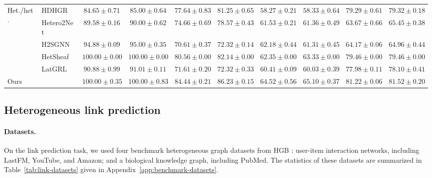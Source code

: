 \begin{table}[t]
{\begin{tabular}{llcccccccc}
    \multirow{5}{*}{Het./het.}
    & HDHGR
    & $84.65 \pm 0.71$
    & $85.00 \pm 0.64$
    & $77.64 \pm 0.83$
    & $81.25 \pm 0.65$
    & $58.27 \pm 0.21$
    & $58.33 \pm 0.64$
    & $79.29 \pm 0.61$
    & $79.32 \pm 0.18$ \\

    & Hetero2Net
    & $89.58 \pm 0.16$
    & $90.00 \pm 0.62$
    & $74.66 \pm 0.69$
    & $78.57 \pm 0.43$
    & $61.53 \pm 0.21$
    & $61.36 \pm 0.49$
    & $63.67 \pm 0.66$
    & $65.45 \pm 0.38$ \\

    & H2SGNN
    & $94.88 \pm 0.09$
    & $95.00 \pm 0.35$
    & $70.61 \pm 0.37$
    & $72.32 \pm 0.14$
    & $62.18 \pm 0.44$
    & $61.31 \pm 0.45$
    & $64.17 \pm 0.06$
    & $64.96 \pm 0.44$ \\

    & HetSheaf
    & $\mathbf{100.00 \pm 0.00}$
    & $\mathbf{100.00 \pm 0.00}$
    & $80.56 \pm 0.00$
    & $82.14 \pm 0.00$
    & $62.35 \pm 0.00$
    & $63.33 \pm 0.00$
    & $79.46 \pm 0.00$
    & $79.46 \pm 0.00$ \\

    & LatGRL
    & $90.88 \pm 0.99$
    & $91.01 \pm 0.11$
    & $71.61 \pm 0.20$
    & $72.32 \pm 0.33$
    & $60.41 \pm 0.09$
    & $60.03 \pm 0.39$
    & $77.98 \pm 0.11$
    & $78.10 \pm 0.41$ \\
    \midrule

    Ours
    & \textbf{\method{}}
    & $\mathbf{100.00 \pm 0.35}$
    & $\mathbf{100.00 \pm 0.83}$
    & $\mathbf{84.44 \pm 0.21}$
    & $\mathbf{86.23 \pm 0.15}$
    & $\mathbf{64.52 \pm 0.56}$
    & $\mathbf{65.10 \pm 0.37}$
    & $\mathbf{81.22 \pm 0.06}$
    & $\mathbf{81.52 \pm 0.20}$ \\
    \bottomrule
  \end{tabular}%
  }
\end{table}



\subsection{Heterogeneous link prediction}
\label{sec:setup-link}

\paragraph{Datasets.}
On the link prediction task, we used four benchmark heterogeneous graph datasets from HGB \cite{lv2021hgb}: user-item interaction networks, including LastFM, YouTube, and Amazon; and a biological knowledge graph, including PubMed. The statistics of these datasets are summarized in Table~\ref{tab:link-datasets} given in Appendix~\ref{app:benchmark-datasets}.


